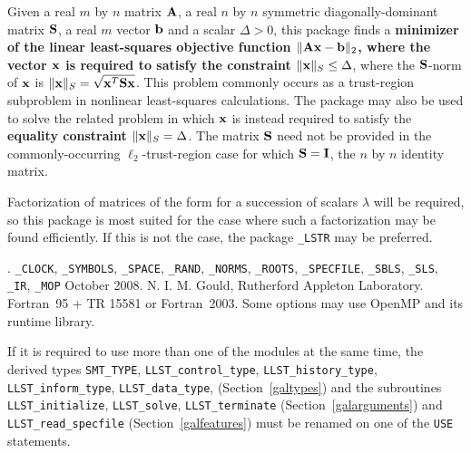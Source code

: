 \documentclass{galahad}
\newcommand{\packagename}{LLST}
\newcommand{\fullpackagename}{\libraryname\_\packagename}
\begin{document}
\galheader


\galsummary
Given a real $m$ by $n$ matrix ${\mathbf{A}}$,
a real $n$ by $n$ symmetric diagonally-dominant matrix ${\mathbf{S}}$,
a real $m$ vector ${\mathbf{b}}$ and a scalar $\Delta>0$, this package finds a
{\bf minimizer of the linear least-squares objective function
$\| {\mathbf{A}} {\mathbf{x}}  - {\mathbf{b}} \|_2$, where the vector ${\mathbf{x}}$ is
required to satisfy the constraint $\|{\mathbf{x}}\|_S \leq  \Delta$},
where the ${\mathbf{S}}$-norm of ${\mathbf{x}}$ is $\|{\mathbf{x}}\|_S = \sqrt{{\mathbf{x}}^T {\mathbf{S}} {\mathbf{x}}}$.
This problem commonly occurs as a trust-region subproblem in nonlinear
least-squares calculations.
The package may also be used to solve the related problem in which ${\mathbf{x}}$ is
instead required to satisfy the
{\bf equality constraint $\|{\mathbf{x}}\|_S = \Delta$}.
The matrix ${\mathbf{S}}$ need not be provided in the commonly-occurring
$\ell_2$-trust-region case for which ${\mathbf{S}} = {\mathbf{I}}$, the $n$ by $n$
identity matrix.

\noindent
Factorization of matrices of the form
for a succession
of scalars $\lambda$ will be required, so this package is most suited
for the case where such a factorization may be found efficiently. If
this is not the case, the package {\tt \libraryname\_LSTR} may be preferred.


\galattributes
\galversions{\tt  \fullpackagename\_single, \fullpackagename\_double}.
\galuses
{\tt \libraryname\_CLOCK},
{\tt \libraryname\_SY\-M\-BOLS},
{\tt \libraryname\_SPACE}, {\tt \libraryname\_\-RAND},
{\tt \libraryname\_\-NORMS},
{\tt \libraryname\_ROOTS}, {\tt \libraryname\_SPECFILE},
{\tt \libraryname\_SBLS},
{\tt \libraryname\_SLS}, {\tt \libraryname\_IR},
{\tt \libraryname\_MOP}
\galdate October 2008.
\galorigin N. I. M. Gould, Rutherford Appleton Laboratory.
\gallanguage Fortran~95 + TR 15581 or Fortran~2003.
\galparallelism Some options may use OpenMP and its runtime library.


\galhowto



\noindent
If it is required to use more than one of the modules at the same time, 
the derived types
{\tt SMT\_TYPE},
{\tt \packagename\_control\_type},
{\tt \packagename\_history\_\-type},
{\tt \packagename\_inform\_type},
{\tt \packagename\_data\_type},
(Section~\ref{galtypes})
and the subroutines
{\tt \packagename\_initialize},
{\tt \packagename\_solve}, {\tt \packagename\_\-terminate}
(Section~\ref{galarguments})
and
{\tt \packagename\_read\_specfile}
(Section~\ref{galfeatures})
must be renamed on one of the {\tt USE} statements.
\end{document}
